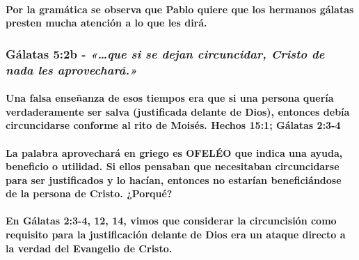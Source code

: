 \documentclass[11a pt,twoside]{article}
\newcommand{\scripture}[1]{%
  {\fontsize{12pt}{16pt}\selectfont\ScriptureFont\itshape #1}%
}
\let\oldsubsubsection\subsubsection
\renewcommand{\subsubsection}{\needspace{4\baselineskip}\oldsubsubsection}
\let\oldparagraph\paragraph
\renewcommand{\paragraph}{\needspace{3\baselineskip}\oldparagraph}
\begin{document}
\paragraph{Por la gramática se observa que Pablo quiere que los hermanos
gálatas presten mucha atención a lo que les
dirá.}\label{por-la-gramuxe1tica-se-observa-que-pablo-quiere-que-los-hermanos-guxe1latas-presten-mucha-atenciuxf3n-a-lo-que-les-diruxe1.}

\subsubsection{\texorpdfstring{Gálatas 5:2b -
\scripture{«…que si se dejan circuncidar, Cristo de nada les aprovechará.»}}{Gálatas 5:2b - }}\label{guxe1latas-52b---que-si-se-dejan-circuncidar-cristo-de-nada-les-aprovecharuxe1.}

\paragraph{Una falsa enseñanza de esos tiempos era que si una persona
quería verdaderamente ser salva (justificada delante de Dios), entonces
debía circuncidarse conforme al rito de Moisés. Hechos 15:1; Gálatas
2:3-4}\label{una-falsa-enseuxf1anza-de-esos-tiempos-era-que-si-una-persona-queruxeda-verdaderamente-ser-salva-justificada-delante-de-dios-entonces-debuxeda-circuncidarse-conforme-al-rito-de-moisuxe9s.-hechos-151-guxe1latas-23-4}

\paragraph{La palabra aprovechará en griego es OFELÉO que indica una
ayuda, beneficio o utilidad. Si ellos pensaban que necesitaban
circuncidarse para ser justificados y lo hacían, entonces no estarían
beneficiándose de la persona de Cristo.
¿Porqué?}\label{la-palabra-aprovecharuxe1-en-griego-es-ofeluxe9o-que-indica-una-ayuda-beneficio-o-utilidad.-si-ellos-pensaban-que-necesitaban-circuncidarse-para-ser-justificados-y-lo-hacuxedan-entonces-no-estaruxedan-beneficiuxe1ndose-de-la-persona-de-cristo.-porquuxe9}

\paragraph{En Gálatas 2:3-4, 12, 14, vimos que considerar la
circuncisión como requisito para la justificación delante de Dios era un
ataque directo a la verdad del Evangelio de
Cristo.}\label{en-guxe1latas-23-4-12-14-vimos-que-considerar-la-circuncisiuxf3n-como-requisito-para-la-justificaciuxf3n-delante-de-dios-era-un-ataque-directo-a-la-verdad-del-evangelio-de-cristo.}
\end{document}
